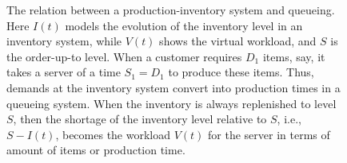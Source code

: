 \documentclass[stochastic-or.tex]{subfiles}
\begin{document}
\begin{figure}[t]
\begin{center}
\caption{
The relation between a production-inventory system and queueing. Here $I(t)$ models the evolution of the inventory level in an inventory system, while $V(t)$ shows the virtual workload, and $S$ is the order-up-to level. When a customer requires $D_1$ items, say, it takes a server of a time $S_1=D_1$ to produce these items. Thus, demands at the inventory system convert into production times in a queueing system. When the inventory is always replenished to level $S$, then the shortage of the inventory level relative to $S$, i.e., $S-I(t)$, becomes the workload $V(t)$ for the server in terms of amount of items or production time.} \label{fig:inv_queue}
\end{center}
\end{figure}




\end{document}
